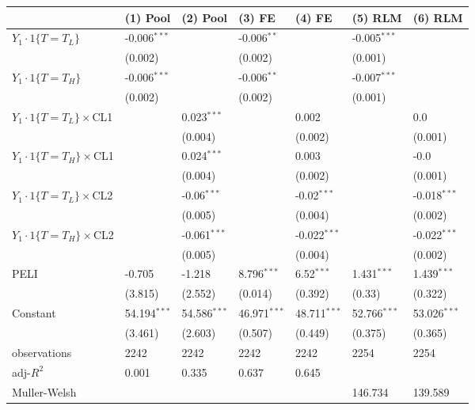 \begin{tabular}{lllllll}
\hline
 & (1) Pool & (2) Pool & (3) FE & (4) FE & (5) RLM & (6) RLM \\
\hline
$Y_1\cdot1\{T=T_L\}$ & -0.006$^{***}$ &  & -0.006$^{**}$ &  & -0.005$^{***}$ &  \\
 & (0.002) &  & (0.002) &  & (0.001) &  \\
$Y_1\cdot1\{T=T_H\}$ & -0.006$^{***}$ &  & -0.006$^{**}$ &  & -0.007$^{***}$ &  \\
 & (0.002) &  & (0.002) &  & (0.001) &  \\
$Y_1\cdot1\{T=T_L\}\times$CL1 &  & 0.023$^{***}$ &  & 0.002 &  & 0.0 \\
 &  & (0.004) &  & (0.002) &  & (0.001) \\
$Y_1\cdot1\{T=T_H\}\times$CL1 &  & 0.024$^{***}$ &  & 0.003 &  & -0.0 \\
 &  & (0.004) &  & (0.002) &  & (0.001) \\
$Y_1\cdot1\{T=T_L\}\times$CL2 &  & -0.06$^{***}$ &  & -0.02$^{***}$ &  & -0.018$^{***}$ \\
 &  & (0.005) &  & (0.004) &  & (0.002) \\
$Y_1\cdot1\{T=T_H\}\times$CL2 &  & -0.061$^{***}$ &  & -0.022$^{***}$ &  & -0.022$^{***}$ \\
 &  & (0.005) &  & (0.004) &  & (0.002) \\
PELI & -0.705 & -1.218 & 8.796$^{***}$ & 6.52$^{***}$ & 1.431$^{***}$ & 1.439$^{***}$ \\
 & (3.815) & (2.552) & (0.014) & (0.392) & (0.33) & (0.322) \\
Constant & 54.194$^{***}$ & 54.586$^{***}$ & 46.971$^{***}$ & 48.711$^{***}$ & 52.766$^{***}$ & 53.026$^{***}$ \\
 & (3.461) & (2.603) & (0.507) & (0.449) & (0.375) & (0.365) \\\hline

observations & 2242 & 2242 & 2242 & 2242 & 2254 & 2254 \\
adj-$R^2$ & 0.001 & 0.335 & 0.637 & 0.645 &  &  \\
Muller-Welsh &  &  &  &  & 146.734 & 139.589 \\
\hline
\end{tabular}
